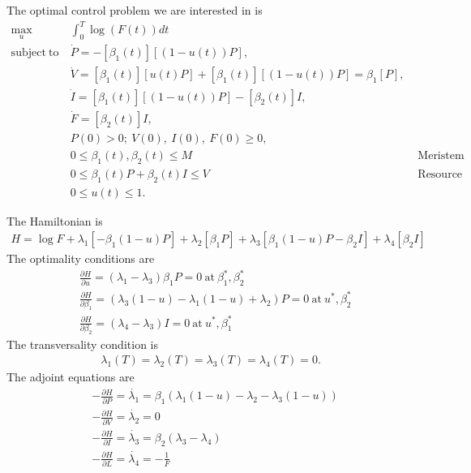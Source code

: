 \documentclass[12pt, oneside]{article}   	%
\begin{document}
The optimal control problem we are interested in is
%
\begin{align}
\max_{u} &  \int_0^T  \log( F(t) ) dt  \nonumber \\
\mathrm{subject\ to\ } 
& \dot{P} = - [\beta_1(t)] [(1 - u(t)) P ] , \nonumber \\
& \dot{V} = [\beta_1(t)] [ u(t) P]  + [\beta_1(t)] [(1 - u(t)) P] = \beta_1 [P] , \nonumber \\ 
& \dot{I} = [\beta_1(t)] [( 1-u(t) ) P] - [\beta_2(t)] I, \nonumber \\ 
& \dot{F} = [\beta_2(t)] I , \nonumber \\ 
& P(0) > 0;\ V(0),\ I(0),\ F(0) \geq 0, \nonumber \\
& 0 \le \beta_1(t), \beta_2(t) \le M & \mbox{ Meristem constraint}  \nonumber \\
& 0 \le \beta_1(t) P + \beta_2(t) I \le V & \mbox{ Resource constraint} \nonumber \\
& 0 \leq u(t) \leq 1.  
\end{align}



\noindent The Hamiltonian is 
%
\begin{align}
H = \log F + \lambda_1 [ - \beta_1 (1-u) P ] + \lambda_2 [ \beta_1 P ]  + \lambda_3 [ \beta_1 (1-u) P - \beta_2 I ] + \lambda_4 [ \beta_2 I ]
\end{align}
%
The optimality conditions are
%
\begin{align}
& \frac{\partial H}{\partial u} = (\lambda_1 - \lambda_3) \beta_1 P = 0\ \mathrm{at}\ \beta_1^*, \beta_2^* \\
&\frac{\partial H}{\partial \beta_1} =  (\lambda_3(1-u) - \lambda_1 (1-u) + \lambda_2) P = 0\ \mathrm{at}\ u^*, \beta_2^* \\
&\frac{\partial H}{\partial \beta_2} =  (\lambda_4 - \lambda_3) I = 0\ \mathrm{at}\ u^*, \beta_1^*
\end{align}
%
The transversality condition is
%
\begin{align}
\lambda_1(T) = \lambda_2(T) = \lambda_3(T) = \lambda_4(T) = 0.
\end{align}
%
The adjoint equations are
%
\begin{align}
&-\frac{\partial H}{\partial P} = \dot{\lambda_1}  = \beta_1 ( \lambda_1 (1-u) - \lambda_2 - \lambda_3 (1-u) ) \nonumber \\
&-\frac{\partial H}{\partial V} = \dot{\lambda_2}  = 0  \nonumber\\
&-\frac{\partial H}{\partial I} = \dot{\lambda_3}  = \beta_2(\lambda_3-\lambda_4) \nonumber \\
&-\frac{\partial H}{\partial L} = \dot{\lambda_4}  = -\frac{1}{F}  
\end{align}
%
\end{document}
